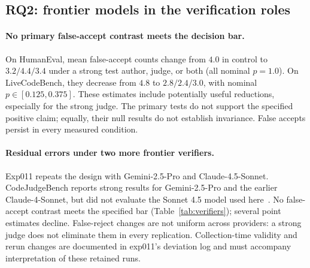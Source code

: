 \subsection{RQ2: frontier models in the verification roles}
\label{sec:results-asym}

\paragraph{No primary false-accept contrast meets the decision bar.} On HumanEval, mean
false-accept counts change from $4.0$ in control to $3.2/4.4/3.4$ under a strong test author,
judge, or both (all nominal $p{=}1.0$). On LiveCodeBench, they decrease from $4.8$ to
$2.8/2.4/3.0$, with nominal $p \in [0.125, 0.375]$. These estimates include potentially
useful reductions, especially for the strong judge. The primary tests do not support the
specified positive claim; equally, their null results do not establish invariance. False
accepts persist in every measured condition.

\paragraph{Residual errors under two more frontier verifiers.} Exp011 repeats the design
with Gemini-2.5-Pro and Claude-4.5-Sonnet. CodeJudgeBench reports strong results for
Gemini-2.5-Pro and the earlier Claude-4-Sonnet, but did not evaluate the Sonnet 4.5 model used
here~\cite{jiang2025codejudgebench}. No false-accept contrast meets the specified bar
(Table~\ref{tab:verifiers}); several point estimates decline. False-reject changes are not
uniform across providers: a strong judge does not eliminate them in every replication.
Collection-time validity and rerun changes are documented in exp011's deviation log and
must accompany interpretation of these retained runs.

